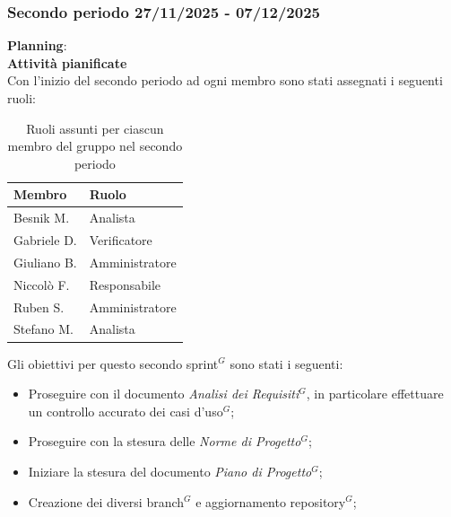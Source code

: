 \documentclass[a4paper,10pt]{article}
\begin{document}
\subsubsection{Secondo periodo 27/11/2025 - 07/12/2025}
\textbf{Planning}: \\
\textbf{Attività pianificate} \\ Con l'inizio del secondo periodo ad ogni membro sono stati assegnati i seguenti ruoli: 
\begin{table}[H]
\centering
\begin{tabular}{|l|l|}
\hline
\textbf{Membro} & \textbf{Ruolo} \\
\hline
Besnik M.  & Analista \\
\hline
Gabriele D.  & Verificatore \\
\hline
Giuliano B. & Amministratore \\
\hline
Niccolò F. & Responsabile \\
\hline
Ruben S. & Amministratore \\
\hline
Stefano M.  & Analista \\
\hline
\end{tabular}
\caption{Ruoli assunti per ciascun membro del gruppo nel secondo periodo}
\end{table}

Gli obiettivi per questo secondo sprint$^G$ sono stati i seguenti:
\begin{itemize}
  \item Proseguire con il documento \textit{Analisi dei Requisiti$^G$}, in particolare effettuare un controllo accurato dei casi d'uso$^G$;
  \item Proseguire con la stesura delle \textit{Norme di Progetto$^G$};
  \item Iniziare la stesura del documento \textit{Piano di Progetto$^G$};
  \item Creazione dei diversi branch$^G$ e aggiornamento repository$^G$;
\end{itemize}
\end{document}
